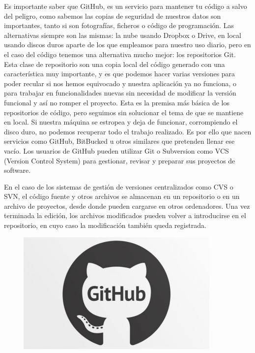 \documentclass[12pt,letterpaper]{article}
\begin{document}
Es importante saber que GitHub, es un servicio para mantener tu código a salvo del peligro, como sabemos las copias de seguridad de nuestros datos son importantes, tanto si son fotografías, ficheros o código de programación. 
Las alternativas siempre son las mismas: la nube usando Dropbox o Drive, en local usando discos duros aparte de los que empleamos para nuestro uso diario, pero en el caso del código tenemos una alternativa mucho mejor: los repositorios Git. Esta clase de repositorio son una copia local del código generado con una característica muy importante, y es que podemos hacer varias versiones para poder recular si nos hemos equivocado y nuestra aplicación ya no funciona, o para trabajar en funcionalidades nuevas sin necesidad de modificar la versión funcional y así no romper el proyecto. Esta es la premisa más básica de los repositorios de código, pero seguimos sin solucionar el tema de que se mantiene en local. Si nuestra máquina se estropea y deja de funcionar, corrompiendo el disco duro, no podemos recuperar todo el trabajo realizado. Es por ello que nacen servicios como GitHub, BitBucked u otros similares que pretenden llenar ese vacío.
Los usuarios de GitHub pueden utilizar Git o Subversion como VCS (Version Control System) para gestionar, revisar y preparar sus proyectos de software.

En el caso de los sistemas de gestión de versiones centralizados como CVS o SVN, el código fuente y otros archivos se almacenan en un repositorio o en un archivo de proyectos, desde donde pueden cargarse en otros ordenadores. Una vez terminada la edición, los archivos modificados pueden volver a introducirse en el repositorio, en cuyo caso la modificación también queda registrada.


\vspace*{-0.025in}
\begin{figure}[htb]
\begin{center}
\includegraphics[width=10cm]{./Imagenes/GithubN}
\end{center}
\end{figure}
\end{document}

